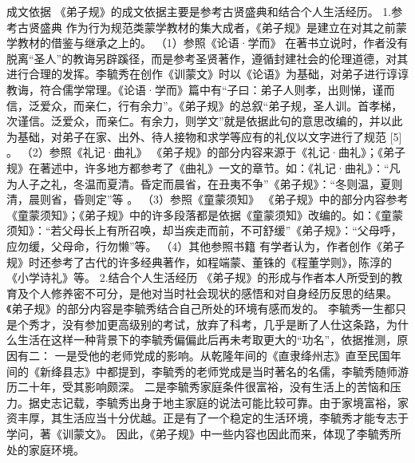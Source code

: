 \documentclass[a4paper,12pt,UTF8,twoside]{ctexbook}
\begin{document}
成文依据
《弟子规》的成文依据主要是参考古贤盛典和结合个人生活经历。
1.参考古贤盛典
作为行为规范类蒙学教材的集大成者，《弟子规》是建立在对其之前蒙学教材的借鉴与继承之上的。
（1）参照《论语·学而》
在著书立说时，作者没有脱离“圣人”的教诲另辟蹊径，而是参考圣贤著作，遵循封建社会的伦理道德，对其进行合理的发挥。李毓秀在创作《训蒙文》时以《论语》为基础，对弟子进行谆谆教诲，符合儒学常理。《论语·学而》篇中有“子曰：弟子人则孝，出则悌，谨而信，泛爱众，而亲仁，行有余力”。《弟子规》的总叙“弟子规，圣人训。首孝梯，次谨信。泛爱众，而亲仁。有余力，则学文”就是依据此句的意思改编的，并以此为基础，对弟子在家、出外、待人接物和求学等应有的礼仪以文字进行了规范 [5]
。
（2）参照《礼记·曲礼》
《弟子规》的部分内容来源于《礼记·曲礼》；《弟子规》在著述中，许多地方都参考了《曲礼》一文的章节。如：《礼记·曲礼》：“凡为人子之礼，冬温而夏清。昏定而晨省，在丑夷不争”《弟子规》：“冬则温，夏则清，晨则省，昏则定”等
。
（3）参照《童蒙须知》
《弟子规》中的部分内容参考《童蒙须知》；《弟子规》中的许多段落都是依据《童蒙须知》改编的。如：《童蒙须知》：“若父母长上有所召唤，却当疾走而前，不可舒缓”《弟子规》：“父母呼，应勿缓，父母命，行勿懒”等。
（4）其他参照书籍
有学者认为，作者创作《弟子规》时还参考了古代的许多经典著作，如程端蒙、董铢的《程董学则》，陈淳的《小学诗礼》等。
2.结合个人生活经历
《弟子规》的形成与作者本人所受到的教育及个人修养密不可分，是他对当时社会现状的感悟和对自身经历反思的结果。《弟子规》的部分内容是李毓秀结合自己所处的环境有感而发的。
李毓秀一生都只是个秀才，没有参加更高级别的考试，放弃了科考，几乎是断了人仕这条路，为什么生活在这样一种背景下的李毓秀偏偏此后再未考取更大的“功名”，依据推测，原因有二：
一是受他的老师党成的影响。从乾隆年间的《直隶绛州志》直至民国年间的《新绛县志》中都提到，李毓秀的老师党成是当时著名的名儒，李毓秀随师游历二十年，受其影响颇深。
二是李毓秀家庭条件很富裕，没有生活上的苦恼和压力。据史志记载，李毓秀出身于地主家庭的说法可能比较可靠。由于家境富裕，家资丰厚，其生活应当十分优越。正是有了一个稳定的生活环境，李毓秀才能专志于学问，著《训蒙文》。
因此，《弟子规》中一些内容也因此而来，体现了李毓秀所处的家庭环境。
\end{document}
